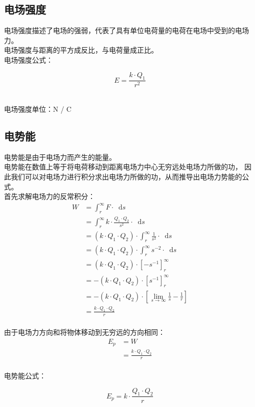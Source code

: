 \documentclass[UTF8]{ctexart}
\newcommand*{\dif}{\mathop{}\!\mathrm{d}}
\begin{document}
\subsection{电场强度}
    电场强度描述了电场的强弱，代表了具有单位电荷量的电荷在电场中受到的电场力。\\[2mm]
    电场强度与距离的平方成反比，与电荷量成正比。\\[3mm]
    电场强度公式：
    \begin{large}
        \begin{equation*}
            E = \dfrac{k \cdot Q_{1}}{{r}^{2}}
        \end{equation*}
    \end{large}\\
    电场强度单位：N / C

\newpage
        
\subsection{电势能}
    电势能是由于电场力而产生的能量。\\[3mm]
    电势能在数值上等于将电荷移动到距离电场力中心无穷远处电场力所做的功，
    因此我们可以对电场力进行积分求出电场力所做的功，从而推导出电场力势能的公式。\\[5mm]
    首先求解电场力的反常积分：
    \setcounter{equation}{0}
    \begin{align}    
        W&=\int_{r}^{\infty} F\cdot \dif s\\[3mm]
        &= \int_{r}^{\infty} k \cdot \frac{Q_{1} \cdot Q_{2}}{{s}^{2}}\cdot\dif s \\[3mm]
        &=(k \cdot Q_{1} \cdot Q_{2}) \cdot \int_{r}^{\infty} \frac{1}{{s}^{2}}\cdot\dif s \\[3mm]
        &=(k \cdot Q_{1} \cdot Q_{2}) \cdot \int_{r}^{\infty} {s}^{-2}\cdot\dif s \\[3mm]
        &=(k \cdot Q_{1} \cdot Q_{2})\cdot\left[-{s}^{-1}\right]_{r}^{\infty} \\[4mm]
        &=-(k \cdot Q_{1} \cdot Q_{2})\cdot\left[{s}^{-1}\right]_{r}^{\infty} \\[3mm]
        &=-(k \cdot Q_{1} \cdot Q_{2})\cdot\left[\lim_{s\to\infty}\frac{1}{s}-\frac{1}{r}\right] \\[3mm]
        &=\frac{k\cdot Q_{1}\cdot Q_{2}}{r}
    \end{align}\\
    由于电场力方向和将物体移动到无穷远的方向相同：\vspace{3pt}
    \begin{align}
        E_p
        &=W\\[4mm]
        &=\frac{k\cdot Q_{1}\cdot Q_{2}}{r}
    \end{align}\\
    电势能公式：
    \begin{large}
        \begin{equation*}
            E_{p} = k \cdot \dfrac{Q_{1} \cdot Q_{2}}{r}
        \end{equation*}
    \end{large}
\end{document}
